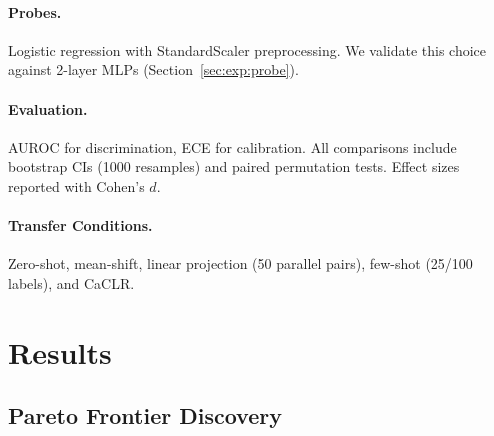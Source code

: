 \documentclass[11pt,a4paper]{article}
\begin{document}
\paragraph{Probes.}
Logistic regression with StandardScaler preprocessing.
We validate this choice against 2-layer MLPs (Section~\ref{sec:exp:probe}).

\paragraph{Evaluation.}
AUROC for discrimination, ECE for calibration.
All comparisons include bootstrap CIs (1000 resamples) and paired permutation tests.
Effect sizes reported with Cohen's $d$.

\paragraph{Transfer Conditions.}
Zero-shot, mean-shift, linear projection (50 parallel pairs), few-shot (25/100 labels), and CaCLR.

\section{Results}
\label{sec:results}

\subsection{Pareto Frontier Discovery}
\label{sec:exp:pareto}
\end{document}
